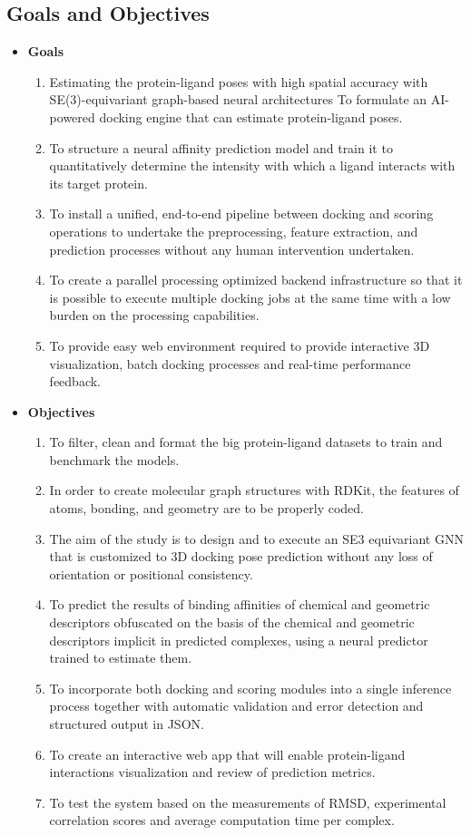 \documentclass[12pt,a4]{report}
\begin{document}
\subsection{Goals and Objectives}
\begin{itemize}
\item \textbf{Goals}
\begin{enumerate}
    \item Estimating the protein-ligand poses with high spatial accuracy with SE(3)-equivariant graph-based neural architectures To formulate an AI-powered docking engine that can estimate protein-ligand poses.
    \item To structure a neural affinity prediction model and train it to quantitatively determine the intensity with which a ligand interacts with its target protein.
    \item To install a unified, end-to-end pipeline between docking and scoring operations to undertake the preprocessing, feature extraction, and prediction processes without any human intervention undertaken.
    \item To create a parallel processing optimized backend infrastructure so that it is possible to execute multiple docking jobs at the same time with a low burden on the processing capabilities.
    \item To provide easy web environment required to provide interactive 3D visualization, batch docking processes and real-time performance feedback.
\end{enumerate}

\item \textbf{Objectives}
\begin{enumerate}
    \item To filter, clean and format the big protein-ligand datasets to train and benchmark the models.
    \item In order to create molecular graph structures with RDKit, the features of atoms, bonding, and geometry are to be properly coded.
    \item The aim of the study is to design and to execute an SE3 equivariant GNN that is customized to 3D docking pose prediction without any loss of orientation or positional consistency.
    \item To predict the results of binding affinities of chemical and geometric descriptors obfuscated on the basis of the chemical and geometric descriptors implicit in predicted complexes, using a neural predictor trained to estimate them.
    \item To incorporate both docking and scoring modules into a single inference process together with automatic validation and error detection and structured output in JSON.
    \item To create an interactive web app that will enable protein-ligand interactions visualization and review of prediction metrics.
    \item To test the system based on the measurements of RMSD, experimental correlation scores and average computation time per complex.
\end{enumerate}
\end{itemize}
\end{document}
